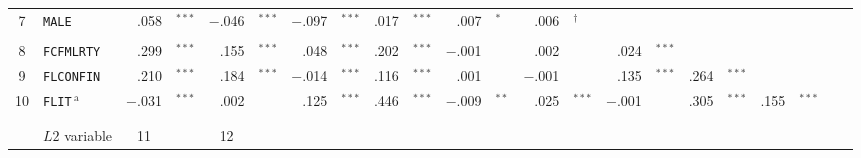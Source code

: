 {\begin{tabular}{cl r@{\hskip -0.1mm}l r@{\hskip -0.1mm}l r@{\hskip -0.1mm}l r@{\hskip -0.1mm}l r@{\hskip -0.1mm}l r@{\hskip -0.1mm}l r@{\hskip -0.1mm}l r@{\hskip -0.1mm}l r@{\hskip -0.1mm}l r@{\hskip -0.1mm}l}
      7     & \texttt{MALE}  & \cellcolor[rgb]{ .945,  .945,  1}.058 & $^{***}$   & \cellcolor[rgb]{ 1,  .953,  .953}$-$.046 & $^{***}$ & \cellcolor[rgb]{ 1,  .902,  .902}$-$.097 & $^{***}$   & \cellcolor[rgb]{ .984,  .984,  1}.017 & $^{***}$   & \cellcolor[rgb]{ .996,  .996,  1}.007 & $^*$     & \cellcolor[rgb]{ .996,  .996,  1}.006 & $^\dagger$     &       &       &       &       &       &       &       &  \\
            &       &       &       &       &       &       &       &       &       &       &       &       &       &       &       &       &       &       &       &       &  \\
      8     & \texttt{FCFMLRTY} & \cellcolor[rgb]{ .702,  .702,  1}.299 & $^{***}$   & \cellcolor[rgb]{ .847,  .847,  1}.155 & $^{***}$ & \cellcolor[rgb]{ .953,  .953,  1}.048 & $^{***}$   & \cellcolor[rgb]{ .8,  .8,  1}.202 & $^{***}$   & \cellcolor[rgb]{ 1,  .996,  .996}$-$.001 &       & .002 &       & \cellcolor[rgb]{ .976,  .976,  1}.024 & $^{***}$ &       &       &       &       &       &  \\
      9     & \texttt{FLCONFIN} & \cellcolor[rgb]{ .792,  .792,  1}.210 & $^{***}$   & \cellcolor[rgb]{ .82,  .82,  1}.184 & $^{***}$ & \cellcolor[rgb]{ 1,  .984,  .984}$-$.014 & $^{***}$   & \cellcolor[rgb]{ .886,  .886,  1}.116 & $^{***}$   & .001 &       & \cellcolor[rgb]{ 1,  .996,  .996}$-$.001 &       & \cellcolor[rgb]{ .867,  .867,  1}.135 & $^{***}$ & \cellcolor[rgb]{ .737,  .737,  1}.264 & $^{***}$   &       &       &       &  \\
      10    & \texttt{FLIT}$\, ^\text{a}$  & \cellcolor[rgb]{ 1,  .969,  .969}$-$.031 & $^{***}$   & .002 &       & \cellcolor[rgb]{ .878,  .878,  1}.125 & $^{***}$   & \cellcolor[rgb]{ .557,  .557,  1}.446 & $^{***}$   & \cellcolor[rgb]{ 1,  .988,  .988}$-$.009 & $^{**}$    & \cellcolor[rgb]{ .976,  .976,  1}.025 & $^{***}$   & \cellcolor[rgb]{ 1,  .996,  .996}$-$.001 &       & \cellcolor[rgb]{ .698,  .698,  1}.305 & $^{***}$   & \cellcolor[rgb]{ .847,  .847,  1}.155 & $^{***}$   &       &  \\
      \bottomrule
            &       &       &       &       &       &       &       &       &       &       &       &       &       &       &       &       &       &       &       &       &  \\
            &       &       &       &       &       &       &       &       &       &       &       &       &       &       &       &       &       &       &       &       &  \\
      \cmidrule[0.08em]{1-6}          & $L2$ variable & \multicolumn{1}{c}{11} &       & \multicolumn{1}{c}{12} &       &       &       &       &       &       &       &       &       &       &       &       &       &       &       &       &  \\

\end{tabular}}
